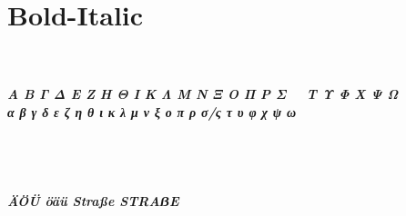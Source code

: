 \documentclass[12pt, a4paper]{article}
\begin{document}
\newpage

\section*{Bold-Italic}

\noindent\textit{\textbf{%
\noindent\AZtext\\
\noindent\aztext\\
\noindent Α Β Γ Δ Ε Ζ Η Θ Ι Κ Λ Μ Ν Ξ Ο Π Ρ Σ~~ Τ Υ Φ Χ Ψ Ω\\
\noindent α β γ δ ε ζ η θ ι κ λ μ ν ξ ο π ρ σ/ς τ υ φ χ ψ ω\\
\noindent\digitstext\\
\noindent\punctext\\
~
\lipsum[0-1]
~\\
~\\
\noindent ÄÖÜ öäü Straße STRAẞE\\
}}

\newpage
\end{document}
